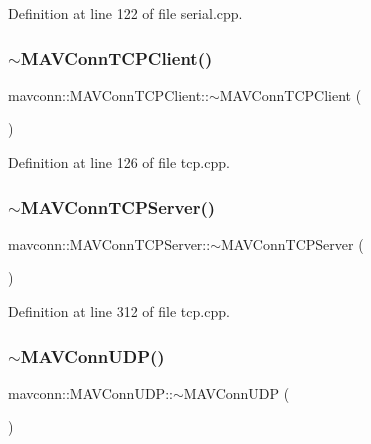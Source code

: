 Definition at line 122 of file serial.\+cpp.

\mbox{\label{group__mavconn_gaa9e9ea305aaaa39aeb4bcb91328d47c5}} 
\subsubsection{\texorpdfstring{$\sim$MAVConnTCPClient()}{~MAVConnTCPClient()}}
{\footnotesize\ttfamily mavconn\+::\+M\+A\+V\+Conn\+T\+C\+P\+Client\+::$\sim$\+M\+A\+V\+Conn\+T\+C\+P\+Client (\begin{DoxyParamCaption}{ }\end{DoxyParamCaption})}



Definition at line 126 of file tcp.\+cpp.

\mbox{\label{group__mavconn_gaee25f07913d08d976e205be3136d813c}} 
\subsubsection{\texorpdfstring{$\sim$MAVConnTCPServer()}{~MAVConnTCPServer()}}
{\footnotesize\ttfamily mavconn\+::\+M\+A\+V\+Conn\+T\+C\+P\+Server\+::$\sim$\+M\+A\+V\+Conn\+T\+C\+P\+Server (\begin{DoxyParamCaption}{ }\end{DoxyParamCaption})}



Definition at line 312 of file tcp.\+cpp.

\mbox{\label{group__mavconn_gad9edacd1a8f5993cdcfb188f83e3ca49}} 
\subsubsection{\texorpdfstring{$\sim$MAVConnUDP()}{~MAVConnUDP()}}
{\footnotesize\ttfamily mavconn\+::\+M\+A\+V\+Conn\+U\+D\+P\+::$\sim$\+M\+A\+V\+Conn\+U\+DP (\begin{DoxyParamCaption}{ }\end{DoxyParamCaption})}



